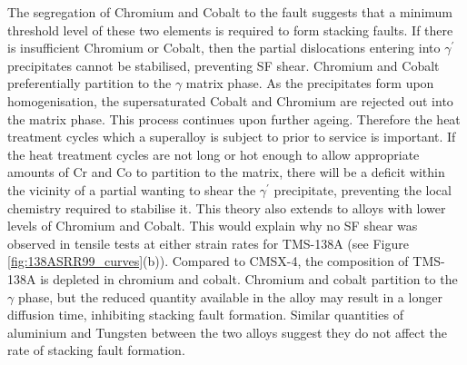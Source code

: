 \documentclass[a4paper,12pt,times,numbered,print,index]{Classes/PhDThesisPSnPDF}
\begin{document}
The segregation of Chromium and Cobalt to the fault suggests that a minimum threshold level of these two elements is required to form stacking faults. If there is insufficient Chromium or Cobalt, then the partial dislocations entering into $\gamma^{\prime}$ precipitates cannot be stabilised, preventing SF shear. Chromium and Cobalt preferentially partition to the $\gamma$ matrix phase.\cite{jarrett1982effects,tien1982effects,oni2016atom,llewelyn2017effect} As the precipitates form upon homogenisation, the supersaturated Cobalt and Chromium are rejected out into the matrix phase. This process continues upon further ageing. Therefore the heat treatment cycles which a superalloy is subject to prior to service is important. If the heat treatment cycles are not long or hot enough to allow appropriate amounts of Cr and Co to partition to the matrix, there will be a deficit within the vicinity of a partial wanting to shear the $\gamma^{\prime}$ precipitate, preventing the local chemistry required to stabilise it. This theory also extends to alloys with lower levels of Chromium and Cobalt. This would explain why no SF shear was observed in tensile tests at either strain rates for TMS-138A (see Figure \ref{fig:138ASRR99_curves}(b)). Compared to CMSX-4, the composition of TMS-138A is depleted in chromium and cobalt. Chromium and cobalt partition to the $\gamma$ phase, but the reduced quantity available in the alloy may result in a longer diffusion time, inhibiting stacking fault formation. Similar quantities of aluminium and Tungsten between the two alloys suggest they do not affect the rate of stacking fault formation.\\
\end{document}
